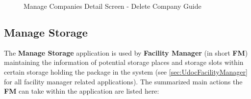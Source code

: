 \bigskip
\begin{figure}[htb!]
	\centering
  
    \vspace{10pt}
    \caption{Manage Companies Detail Screen - Delete Company Guide}
	\label{fig:MCDetailDeleteGuide}
\end{figure}



\subsection{Manage Storage}
\label{subsec:ms}

The \textbf{Manage Storage} application is used by \textbf{Facility Manager} (in short \textbf{FM}) maintaining the information of potential storage places and storage slots within certain storage holding the package in the system (see \autoref{sec:UdocFacilityManager} for all facility manager related applications).  
The summarized main actions the \textbf{FM} can take within the application are listed here:

